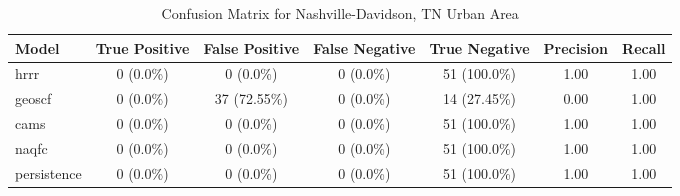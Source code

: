 \begin{table}[h!]
\centering
\begin{tabular}{lcccccc}
\hline
Model & True Positive & False Positive & False Negative & True Negative & Precision & Recall\\ \hline
hrrr & 0 (0.0\%) & 0 (0.0\%) & 0 (0.0\%) & 51 (100.0\%) & \cellcolor{green!25}1.00 & \cellcolor{green!25}1.00 \\ 
geoscf & 0 (0.0\%) & 37 (72.55\%) & 0 (0.0\%) & 14 (27.45\%) & \cellcolor{red!25}0.00 & \cellcolor{green!25}1.00 \\ 
cams & 0 (0.0\%) & 0 (0.0\%) & 0 (0.0\%) & 51 (100.0\%) & \cellcolor{green!25}1.00 & \cellcolor{green!25}1.00 \\ 
naqfc & 0 (0.0\%) & 0 (0.0\%) & 0 (0.0\%) & 51 (100.0\%) & \cellcolor{green!25}1.00 & \cellcolor{green!25}1.00 \\ 
persistence & 0 (0.0\%) & 0 (0.0\%) & 0 (0.0\%) & 51 (100.0\%) & 1.00 & 1.00 \\ 
\hline
\end{tabular}
\caption{Confusion Matrix for Nashville-Davidson, TN Urban Area}
\end{table}
